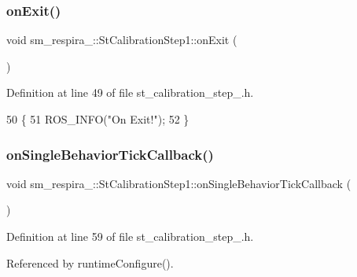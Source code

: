\subsubsection{\texorpdfstring{on\+Exit()}{onExit()}}
{\footnotesize\ttfamily void sm\+\_\+respira\+\_\+::\+St\+Calibration\+Step1\+::on\+Exit (\begin{DoxyParamCaption}{ }\end{DoxyParamCaption})\hspace{0.3cm}{\ttfamily [inline]}}



Definition at line 49 of file st\+\_\+calibration\+\_\+step\+\_.\+h.


\begin{DoxyCode}
50     \{
51         ROS\_INFO(\textcolor{stringliteral}{"On Exit!"});
52     \}
\end{DoxyCode}
\mbox{\label{structsm__respira__1_1_1StCalibrationStep1_a5753db04586e997320c8e3916c6c2642}} 
\subsubsection{\texorpdfstring{on\+Single\+Behavior\+Tick\+Callback()}{onSingleBehaviorTickCallback()}}
{\footnotesize\ttfamily void sm\+\_\+respira\+\_\+::\+St\+Calibration\+Step1\+::on\+Single\+Behavior\+Tick\+Callback (\begin{DoxyParamCaption}{ }\end{DoxyParamCaption})\hspace{0.3cm}{\ttfamily [inline]}}



Definition at line 59 of file st\+\_\+calibration\+\_\+step\+\_.\+h.



Referenced by runtime\+Configure().


